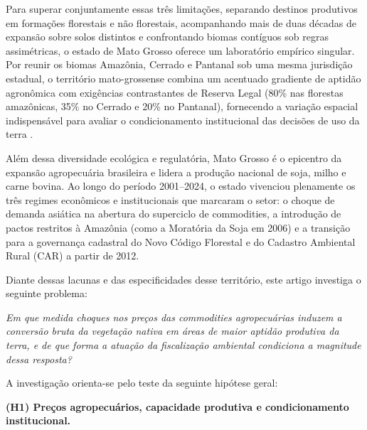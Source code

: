 Para superar conjuntamente essas três limitações, separando destinos produtivos em formações florestais e não florestais, acompanhando mais de duas décadas de expansão sobre solos distintos e confrontando biomas contíguos sob regras assimétricas, o estado de Mato Grosso oferece um laboratório empírico singular. Por reunir os biomas Amazônia, Cerrado e Pantanal sob uma mesma jurisdição estadual, o território mato-grossense combina um acentuado gradiente de aptidão agronômica com exigências contrastantes de Reserva Legal (80\% nas florestas amazônicas, 35\% no Cerrado e 20\% no Pantanal), fornecendo a variação espacial indispensável para avaliar o condicionamento institucional das decisões de uso da terra \cite{VanWeyEtAl2013, SimoesEtAl2020}.

Além dessa diversidade ecológica e regulatória, Mato Grosso é o epicentro da expansão agropecuária brasileira e lidera a produção nacional de soja, milho e carne bovina. Ao longo do período 2001--2024, o estado vivenciou plenamente os três regimes econômicos e institucionais que marcaram o setor: o choque de demanda asiática na abertura do superciclo de commodities, a introdução de pactos restritos à Amazônia (como a Moratória da Soja em 2006) e a transição para a governança cadastral do Novo Código Florestal e do Cadastro Ambiental Rural (CAR) a partir de 2012.


Diante dessas lacunas e das especificidades desse território, este artigo investiga o seguinte problema:

\medskip

\noindent\emph{Em que medida choques nos preços das commodities agropecuárias induzem a conversão bruta da vegetação nativa em áreas de maior aptidão produtiva da terra, e de que forma a atuação da fiscalização ambiental condiciona a magnitude dessa resposta?}

\medskip

A investigação orienta-se pelo teste da seguinte hipótese geral:

\medskip

\noindent\textbf{(H1) Preços agropecuários, capacidade produtiva e condicionamento institucional.}

